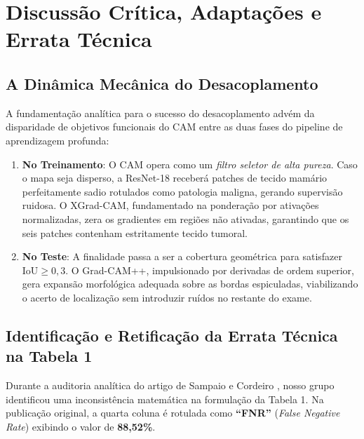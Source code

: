 \documentclass[12pt]{article}
\begin{document}
\section{Discussão Crítica, Adaptações e Errata Técnica}

\subsection{A Dinâmica Mecânica do Desacoplamento}

A fundamentação analítica para o sucesso do desacoplamento advém da disparidade de objetivos funcionais do CAM entre as duas fases do pipeline de aprendizagem profunda:
\begin{enumerate}
    \item \textbf{No Treinamento}: O CAM opera como um \textit{filtro seletor de alta pureza}. Caso o mapa seja disperso, a ResNet-18 receberá patches de tecido mamário perfeitamente sadio rotulados como patologia maligna, gerando supervisão ruidosa. O XGrad-CAM, fundamentado na ponderação por ativações normalizadas, zera os gradientes em regiões não ativadas, garantindo que os seis patches contenham estritamente tecido tumoral.
    \item \textbf{No Teste}: A finalidade passa a ser a cobertura geométrica para satisfazer $\text{IoU} \ge 0,3$. O Grad-CAM++, impulsionado por derivadas de ordem superior, gera expansão morfológica adequada sobre as bordas espiculadas, viabilizando o acerto de localização sem introduzir ruídos no restante do exame.
\end{enumerate}

\subsection{Identificação e Retificação da Errata Técnica na Tabela 1}

Durante a auditoria analítica do artigo de Sampaio e Cordeiro \cite{sampaio2022study}, nosso grupo identificou uma inconsistência matemática na formulação da Tabela 1. Na publicação original, a quarta coluna é rotulada como \textbf{``FNR''} (\textit{False Negative Rate}) exibindo o valor de \textbf{88,52\%}.
\end{document}
